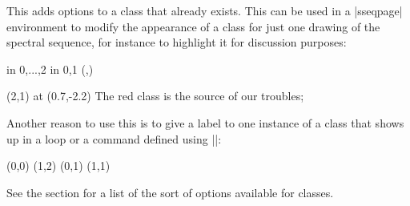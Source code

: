 \documentclass{ltxdoc}
\begin{document}
\begin{sseqdata}[name=ex1,degree={#1}{1-#1}]
\begin{command}{}
This adds options to a class that already exists. This can be used in a |sseqpage| environment to modify the appearance of a class for just one drawing of the spectral sequence, for instance to highlight it for discussion purposes:
\begin{codeexample}[width=5cm]
\begin{sseqdata}[name=class options example,classes=fill]
\foreach \x in {0,...,2} \foreach \y in {0,1}{
    \class(\x,\y)
}
\end{sseqdata}
\begin{sseqpage}[name=class options example]
\classoptions[red](2,1) %
\node[background,text width=10em] at (0.7,-2.2) 
    {\textup{The red class is the source of our troubles}};
\end{sseqpage}
\end{codeexample}
Another reason to use this is to give a label to one instance of a class that shows up in a loop or a command defined using |\sseqnewgroup|:
\begin{codeexample}[width=6cm]
\sseqnewgroup{}
\begin{sseqpage}[classes=fill,class labels={left=0.3em}]
\mygroup(0,0)
\mygroup(1,2)
\classoptions["2"](0,1)
\classoptions["\eta"](1,1)
\end{sseqpage}
\end{codeexample}
See the  section for a list of the sort of options available for classes. 
\end{command}


\end{sseqdata}
\end{document}
